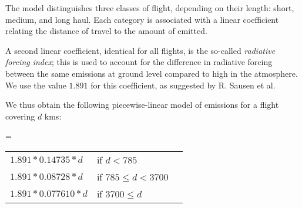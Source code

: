 The model distinguishes three classes of flight, depending on their length:
short, medium, and long haul. Each category is associated with a linear
coefficient relating the distance of travel to the amount of \gaz
emitted.  

A second linear coefficient, identical for all flights, is the so-called
\emph{radiative forcing index}; this is used to account for the difference
in radiative forcing between the same emissions at ground level compared to
high in the atmosphere.  We use the value $1.891$ for this coefficient, as
suggested by R. Sausen et al.~\cite{Sausen05}

We thus obtain the following piecewise-linear model of emissions for a
flight covering $d$ kms: 

\begin{center}
\gazunit \quad=\quad
\begin{tabular}{@{}lll}
$1.891 * 0.14735 * d$ & if $d < 785$ \\
$1.891 * 0.08728 * d$ & if $785 \leq d < 3700$ \\
$1.891 * 0.077610 * d$ & if $3700\leq d  $ 
\end{tabular}
\end{center}



